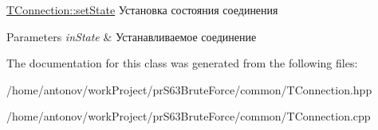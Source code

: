 \hyperlink{classconnection_1_1_t_connection_aa61ae6037f6b70cd97c9fc9c04f43629}{T\+Connection\+::set\+State} Установка состояния соединения 


\begin{DoxyParams}{Parameters}
{\em in\+State} & Устанавливаемое соединение \\
\hline
\end{DoxyParams}


The documentation for this class was generated from the following files\+:\begin{DoxyCompactItemize}
\item 
/home/antonov/work\+Project/pr\+S63\+Brute\+Force/common/T\+Connection.\+hpp\item 
/home/antonov/work\+Project/pr\+S63\+Brute\+Force/common/T\+Connection.\+cpp\end{DoxyCompactItemize}
